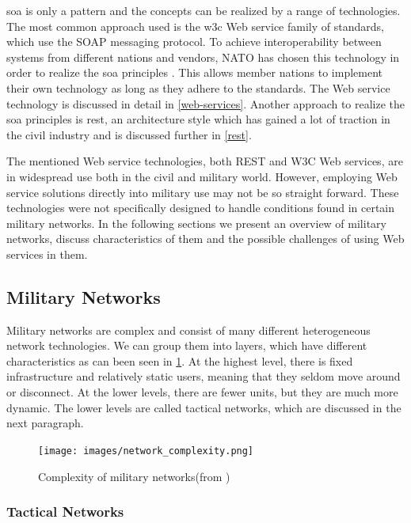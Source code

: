 \gls{soa} is only a pattern and the concepts can be realized by a range of
technologies. The most common approach used is the \gls{w3c} Web service family
of standards, which use the SOAP messaging protocol. To achieve interoperability
between systems from different nations and vendors, NATO has chosen this
technology in order to realize the \gls{soa} principles \cite{soa-baseline}. This
allows member nations to implement their own technology as long as they adhere
to the standards. The Web service technology is discussed in detail in
\cref{web-services}. Another approach to realize the \gls{soa} principles is
\gls{rest}, an architecture style which has gained a lot of traction in the
civil industry and is discussed further in \cref{rest}.

The mentioned Web service technologies, both REST and W3C Web services, are in
widespread use both in the civil and military world. However, employing Web
service solutions directly into military use may not be so straight forward.
These technologies were not specifically designed to handle conditions found in
certain military networks. In the following sections we present an overview of
military networks, discuss characteristics of them and the possible challenges
of using Web services in them.

\subsection{Military Networks}

Military networks are complex and consist of many different heterogeneous
network technologies. We can group them into layers, which have different
characteristics as can been seen in \cref{figure:military-networks}. At the
highest level, there is fixed infrastructure and relatively static users,
meaning that they seldom move around or disconnect. At the lower levels, there
are fewer units, but they are much more dynamic. The lower levels are called
tactical networks, which are discussed in the next paragraph.

\begin{figure}[h]
\texttt{[image: images/network\_complexity.png]}
\caption{Complexity of military networks(from \cite{pervasive-web})}
\label{figure:military-networks}
\end{figure}

\subsubsection{Tactical Networks}

